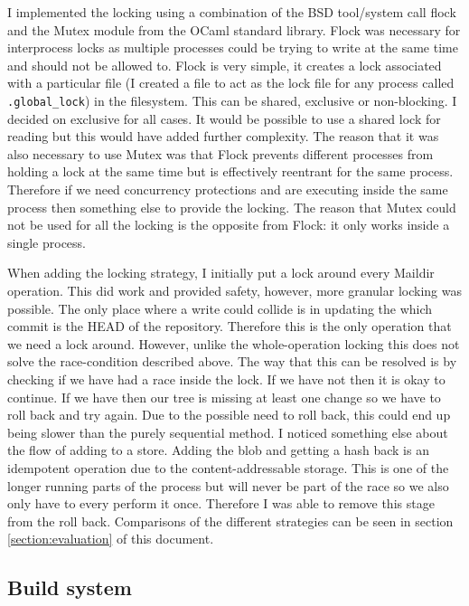 I implemented the locking using a combination of the BSD tool/system call flock\cite{manual_flock} and the Mutex module from the OCaml standard library. Flock was necessary for interprocess locks as multiple processes could be trying to write at the same time and should not be allowed to. Flock is very simple, it creates a lock associated with a particular file (I created a file to act as the lock file for any process called \texttt{.global\_lock}) in the filesystem. This can be shared, exclusive or non-blocking. I decided on exclusive for all cases. It would be possible to use a shared lock for reading but this would have added further complexity. The reason that it was also necessary to use Mutex was that Flock prevents different processes from holding a lock at the same time but is effectively reentrant for the same process. Therefore if we need concurrency protections and are executing inside the same process then something else to provide the locking. The reason that Mutex could not be used for all the locking is the opposite from Flock: it only works inside a single process.

When adding the locking strategy, I initially put a lock around every Maildir operation. This did work and provided safety, however, more granular locking was possible. The only place where a write could collide is in updating the which commit is the HEAD of the repository. Therefore this is the only operation that we need a lock around. However, unlike the whole-operation locking this does not solve the race-condition described above. The way that this can be resolved is by checking if we have had a race inside the lock. If we have not then it is okay to continue. If we have then our tree is missing at least one change so we have to roll back and try again. Due to the possible need to roll back, this could end up being slower than the purely sequential method. I noticed something else about the flow of adding to a store. Adding the blob and getting a hash back is an idempotent operation due to the content-addressable storage. This is one of the longer running parts of the process but will never be part of the race so we also only have to every perform it once. Therefore I was able to remove this stage from the roll back. Comparisons of the different strategies can be seen in section \ref{section:evaluation} of this document.

\subsection{Build system}

